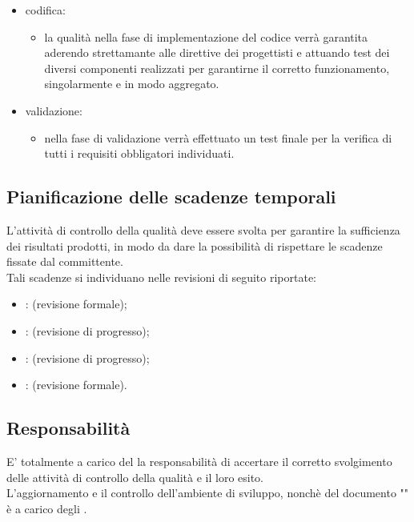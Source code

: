 \begin{itemize}
\begin{itemize}
			\end{itemize}
		\item codifica: 
			\begin{itemize}
				\item la qualità nella fase di implementazione del codice verrà garantita aderendo strettamante alle direttive dei progettisti e attuando test dei diversi componenti realizzati per garantirne il corretto funzionamento, singolarmente e in modo aggregato.
			\end{itemize}
		\item validazione:
			\begin{itemize}
				\item nella fase di validazione verrà effettuato un test finale per la verifica di tutti i requisiti obbligatori individuati.
			\end{itemize}
	\end{itemize}
	\subsection{Pianificazione delle scadenze temporali}
	L'attività di controllo della qualità deve essere svolta per garantire la sufficienza dei risultati prodotti, in modo da dare la possibilità di rispettare le scadenze fissate dal committente.\\
	Tali scadenze si individuano nelle revisioni di seguito riportate:
		\begin{itemize}
			\item {}:  (revisione formale);
			\item {}: (revisione di progresso);
			\item {}: (revisione di progresso);
			\item {}: (revisione formale).
		\end{itemize}
	
	\subsection{Responsabilità}
	E' totalmente a carico del  la responsabilità di accertare il corretto svolgimento delle attività di controllo della qualità e il loro esito.\\
	L'aggiornamento e il controllo dell'ambiente di sviluppo, nonchè del documento "" è a carico degli .
